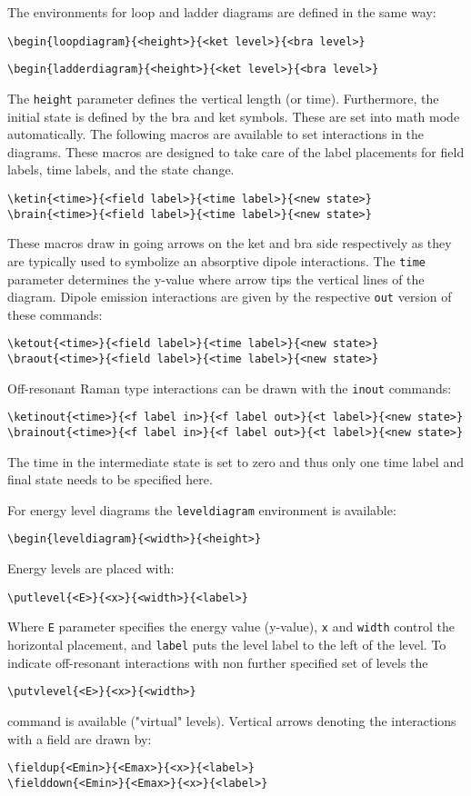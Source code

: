 \documentclass[12pt,letterpaper]{article}
\begin{document}
The environments for loop and ladder diagrams are defined in the same way:
\begin{verbatim}
\begin{loopdiagram}{<height>}{<ket level>}{<bra level>}
\end{verbatim}
\begin{verbatim}
\begin{ladderdiagram}{<height>}{<ket level>}{<bra level>}
\end{verbatim}   
The \verb|height| parameter defines the vertical length (or time). Furthermore,
the initial state is defined by the bra and ket symbols. These are set into math
mode automatically.
The following macros are available to set interactions in the diagrams. These
macros are designed to take care of the label placements for field labels, time
labels, and the state change.
\begin{verbatim}
\ketin{<time>}{<field label>}{<time label>}{<new state>}
\brain{<time>}{<field label>}{<time label>}{<new state>}
\end{verbatim}
These macros draw in going arrows on the ket and bra side respectively as they
are typically used to symbolize an absorptive dipole interactions. The
\verb|time| parameter determines the y-value where arrow tips the vertical lines
of the diagram.
Dipole emission interactions are given by the respective \verb|out| version of these
commands:
\begin{verbatim}
\ketout{<time>}{<field label>}{<time label>}{<new state>}
\braout{<time>}{<field label>}{<time label>}{<new state>}
\end{verbatim}
Off-resonant Raman type interactions can be drawn with the \verb|inout| commands:
\begin{verbatim}
\ketinout{<time>}{<f label in>}{<f label out>}{<t label>}{<new state>}
\brainout{<time>}{<f label in>}{<f label out>}{<t label>}{<new state>}
\end{verbatim}
The time in the intermediate state is set to zero and thus only one time label
and final state needs to be specified here.

For energy level diagrams the \verb|leveldiagram| environment is available:
\begin{verbatim}
\begin{leveldiagram}{<width>}{<height>}
\end{verbatim}
Energy levels are placed with:
\begin{verbatim}
\putlevel{<E>}{<x>}{<width>}{<label>}
\end{verbatim}
Where \verb|E| parameter specifies the energy value (y-value), \verb|x|
and \verb|width| control the horizontal placement, and \verb|label| puts
the level label to the left of the level.
To indicate off-resonant interactions with non further specified set of
levels the
\begin{verbatim}
\putvlevel{<E>}{<x>}{<width>}
\end{verbatim}
command is available ("virtual" levels). Vertical arrows denoting the interactions
with a field are drawn by:
\begin{verbatim}
\fieldup{<Emin>}{<Emax>}{<x>}{<label>}
\fielddown{<Emin>}{<Emax>}{<x>}{<label>}
\end{verbatim}
\end{document}

